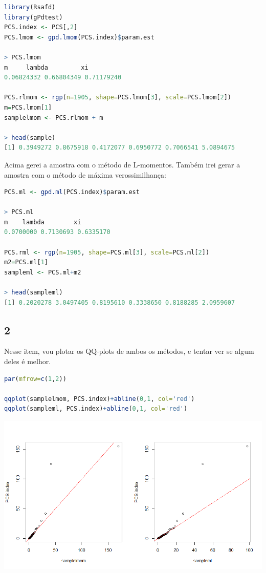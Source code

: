 \documentclass[12pt]{article}
\begin{document}
\begin{lstlisting}[language=R]
library(Rsafd)
library(gPdtest)
PCS.index <- PCS[,2]
PCS.lmom <- gpd.lmom(PCS.index)$param.est

> PCS.lmom
m     lambda         xi 
0.06824332 0.66804349 0.71179240 

PCS.rlmom <- rgp(n=1905, shape=PCS.lmom[3], scale=PCS.lmom[2])
m=PCS.lmom[1]
samplelmom <- PCS.rlmom + m

> head(sample)
[1] 0.3949272 0.8675918 0.4172077 0.6950772 0.7066541 5.0894675
\end{lstlisting}

Acima gerei a amostra com o método de L-momentos. Também irei gerar a amostra com o método de máxima verossimilhança:

\begin{lstlisting}[language=R]
PCS.ml <- gpd.ml(PCS.index)$param.est

> PCS.ml
m    lambda        xi 
0.0700000 0.7130693 0.6335170 

PCS.rml <- rgp(n=1905, shape=PCS.ml[3], scale=PCS.ml[2])
m2=PCS.ml[1]
sampleml <- PCS.ml+m2

> head(sampleml)
[1] 0.2020278 3.0497405 0.8195610 0.3338650 0.8188285 2.0959607
\end{lstlisting}

\subsection*{2}
Nesse item, vou plotar os QQ-plots de ambos os métodos, e tentar ver se algum deles é melhor.

\begin{lstlisting}[language=R]
par(mfrow=c(1,2))

qqplot(samplelmom, PCS.index)+abline(0,1, col='red')
qqplot(sampleml, PCS.index)+abline(0,1, col='red')
\end{lstlisting}

\begin{center}
	\includegraphics*[scale=0.7]{2.png}
\end{center}
\end{document}
